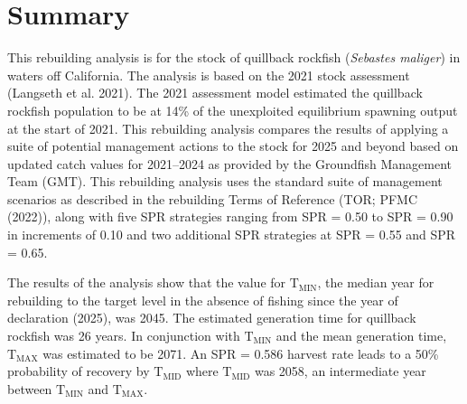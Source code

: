 \documentclass[11pt,
  letterpaper,
]{article}
\begin{document}
\pagestyle{plain}  %
\renewcommand*{\thefootnote}{\arabic{footnote}}  %
\setcounter{footnote}{0}  %
\renewcommand{\headrulewidth}{0.5pt}
\renewcommand{\footrulewidth}{0.5pt}

\newcommand{\lt}{\ensuremath <}
\newcommand{\gt}{\ensuremath >}

\pagebreak
{}
\setcounter{page}{1}

\renewcommand{\thetable}{\roman{table}}
\renewcommand{\thefigure}{\roman{figure}}

\setlength\parskip{0.5em plus 0.1em minus 0.2em}

\pagebreak

\hypertarget{summary}{%
\section*{Summary}\label{summary}}

This rebuilding analysis is for the stock of quillback rockfish (\emph{Sebastes maliger}) in waters off California. The analysis is based on the 2021 stock assessment (Langseth et al. 2021). The 2021 assessment model estimated the quillback rockfish population to be at 14\% of the unexploited equilibrium spawning output at the start of 2021. This rebuilding analysis compares the results of applying a suite of potential management actions to the stock for 2025 and beyond based on updated catch values for 2021--2024 as provided by the Groundfish Management Team (GMT). This rebuilding analysis uses the standard suite of management scenarios as described in the rebuilding Terms of Reference (TOR; PFMC (2022)), along with five SPR strategies ranging from SPR = 0.50 to SPR = 0.90 in increments of 0.10 and two additional SPR strategies at SPR = 0.55 and SPR = 0.65.

The results of the analysis show that the value for \(\text{T}_\text{MIN}\), the median year for rebuilding to the target level in the absence of fishing since the year of declaration (2025), was 2045. The estimated generation time for quillback rockfish was 26 years. In conjunction with \(\text{T}_\text{MIN}\) and the mean generation time, \(\text{T}_\text{MAX}\) was estimated to be 2071. An SPR = 0.586 harvest rate leads to a 50\% probability of recovery by \(\text{T}_\text{MID}\) where \(\text{T}_\text{MID}\) was 2058, an intermediate year between \(\text{T}_\text{MIN}\) and \(\text{T}_\text{MAX}\).
\end{document}
